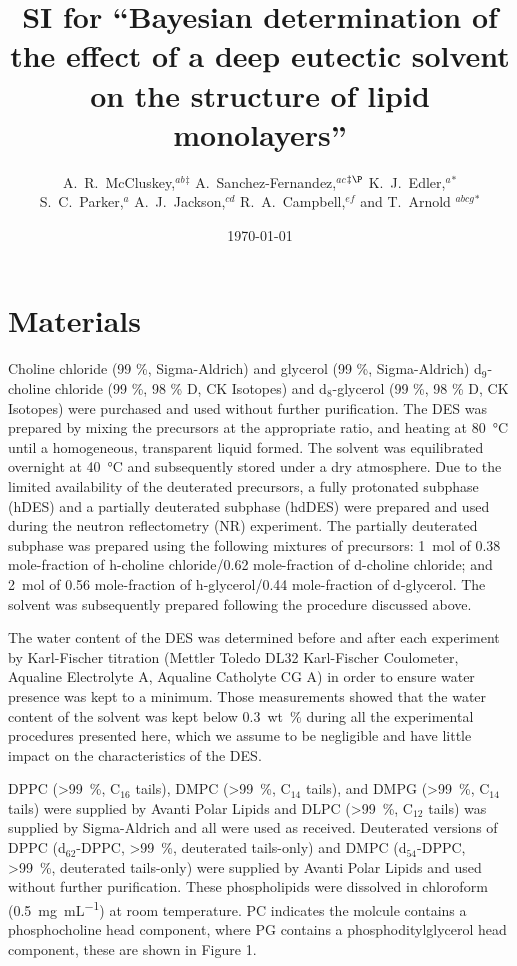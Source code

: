 \documentclass[11pt,a4paper]{paper}
\title{SI for ``Bayesian determination of the effect of a deep eutectic solvent on the structure of lipid monolayers''}
\author{A.~R.~McCluskey,\textit{$^{ab}$}$^{\ddag}$ A.~Sanchez-Fernandez,\textit{$^{ac}$}$^{\ddag\P}$ K.~J.~Edler,\textit{$^{a}$}$^{\ast}$ \\
S.~C.~Parker,\textit{$^{a}$} A.~J.~Jackson,\textit{$^{cd}$} R.~A.~Campbell,\textit{$^{ef}$} and T.~Arnold \textit{$^{abcg}$}$^{\ast}$}
\date{\today}
\begin{document}
\maketitle

\section{Materials}
Choline chloride (99 \%, Sigma-Aldrich) and glycerol (99 \%, Sigma-Aldrich) d$_9$-choline chloride (99 \%, 98 \% D, CK Isotopes) and d$_8$-glycerol (99 \%, 98 \% D, CK Isotopes)  were purchased and used without further purification. The DES was prepared by mixing the precursors at the appropriate ratio, and heating at \SI{80}{\celsius} until a homogeneous, transparent liquid formed.\cite{Smith2014} The solvent was equilibrated overnight at \SI{40}{\celsius} and subsequently stored under a dry atmosphere. Due to the limited availability of the deuterated precursors, a fully protonated subphase (hDES) and a partially deuterated subphase (hdDES) were prepared and used during the neutron reflectometry (NR) experiment. The partially deuterated subphase was prepared using the following mixtures of precursors: \SI{1}{\mole} of 0.38 mole-fraction of h-choline chloride/0.62 mole-fraction of d-choline chloride; and \SI{2}{\mole} of 0.56 mole-fraction of h-glycerol/0.44 mole-fraction of d-glycerol. The solvent was subsequently prepared following the procedure discussed above.

The water content of the DES was determined before and after each experiment by Karl-Fischer titration (Mettler Toledo DL32 Karl-Fischer Coulometer, Aqualine Electrolyte A, Aqualine Catholyte CG A) in order to ensure water presence was kept to a minimum. Those measurements showed that the water content of the solvent was kept below \SI{0.3}{wt\percent} during all the experimental procedures presented here, which we assume to be negligible and have little impact on the characteristics of the DES.\cite{Hammond2016,Hammond2017}

DPPC (\SI{>99}{\percent}, C$_{16}$ tails), DMPC (\SI{>99}{\percent}, C$_{14}$ tails), and DMPG (\SI{>99}{\percent}, C$_{14}$ tails) were supplied by Avanti Polar Lipids and DLPC (\SI{>99}{\percent}, C$_{12}$ tails) was supplied by Sigma-Aldrich and all were used as received. Deuterated versions of DPPC (d$_{62}$-DPPC, \SI{>99}{\percent}, deuterated tails-only) and DMPC (d$_{54}$-DPPC, \SI{>99}{\percent}, deuterated tails-only) were supplied by Avanti Polar Lipids and used without further purification. These phospholipids were dissolved in chloroform (\SI{0.5}{\milli\gram\per\milli\liter}) at room temperature. PC indicates the molcule contains a phosphocholine head component, where PG contains a phosphoditylglycerol head component, these are shown in Figure 1.
\end{document}
